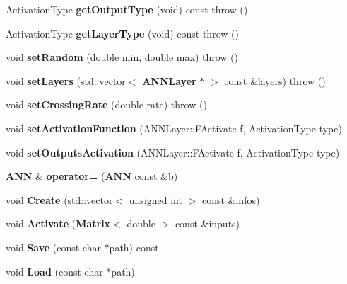 \begin{DoxyCompactItemize}
\item 
Activation\+Type {\bfseries get\+Output\+Type} (void) const   throw ()\label{class_g_a_n_n_1_1_a_n_n_a5b018a16c817ea663979847b51759299}

\item 
Activation\+Type {\bfseries get\+Layer\+Type} (void) const   throw ()\label{class_g_a_n_n_1_1_a_n_n_abe0b24faf6c8664c66157c6de3a92774}

\item 
void {\bfseries set\+Random} (double min, double max)  throw ()\label{class_g_a_n_n_1_1_a_n_n_adcedd9edf79df8a07a25d11cdefb5310}

\item 
void {\bfseries set\+Layers} (std\+::vector$<$ {\bf A\+N\+N\+Layer} $\ast$ $>$ const \&layers)  throw ()\label{class_g_a_n_n_1_1_a_n_n_aae6cc0117e368dec728e5164fd4877cc}

\item 
void {\bfseries set\+Crossing\+Rate} (double rate)  throw ()\label{class_g_a_n_n_1_1_a_n_n_a4476dd0e4d95747cae5489db42639190}

\item 
void {\bfseries set\+Activation\+Function} (A\+N\+N\+Layer\+::\+F\+Activate f, Activation\+Type type)\label{class_g_a_n_n_1_1_a_n_n_a416cb5c5b0d916a9f2ed005494f07be6}

\item 
void {\bfseries set\+Outputs\+Activation} (A\+N\+N\+Layer\+::\+F\+Activate f, Activation\+Type type)\label{class_g_a_n_n_1_1_a_n_n_acc21816e2cb7543eb64d01d9f4a2e30a}

\item 
{\bf A\+N\+N} \& {\bfseries operator=} ({\bf A\+N\+N} const \&b)\label{class_g_a_n_n_1_1_a_n_n_a854dad61d6d8099bf1b9a8d3930a73ab}

\item 
void {\bfseries Create} (std\+::vector$<$ unsigned int $>$ const \&infos)\label{class_g_a_n_n_1_1_a_n_n_a65b8b6fd67dc3a07a40a39cc611af319}

\item 
void {\bfseries Activate} ({\bf Matrix}$<$ double $>$ const \&inputs)\label{class_g_a_n_n_1_1_a_n_n_a6e5ff8d7eaf90d7f38547763efcb4ab7}

\item 
void {\bfseries Save} (const char $\ast$path) const \label{class_g_a_n_n_1_1_a_n_n_a523bdbe95d22035e8019868f619aa50e}

\item 
void {\bfseries Load} (const char $\ast$path)\label{class_g_a_n_n_1_1_a_n_n_a6509ae3de47262d62a68056c24d06b92}

\end{DoxyCompactItemize}


